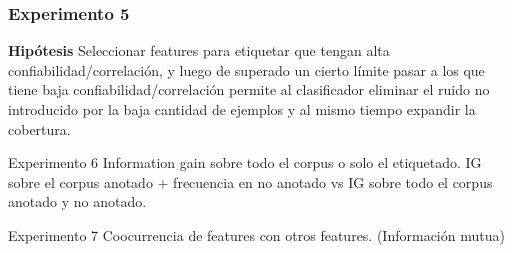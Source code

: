 \subsubsection{Experimento 5}
\textbf{Hipótesis} Seleccionar features para etiquetar que tengan alta confiabilidad/correlación, y luego de superado un cierto límite pasar a los que tiene baja confiabilidad/correlación permite al clasificador eliminar el ruido no introducido por la baja cantidad de ejemplos y al mismo tiempo expandir la cobertura.


Experimento 6
Information gain sobre todo el corpus o solo el etiquetado.
IG sobre el corpus anotado + frecuencia en no anotado vs IG sobre todo el corpus anotado y no anotado.


Experimento 7
Coocurrencia de features con otros features. (Información mutua)


